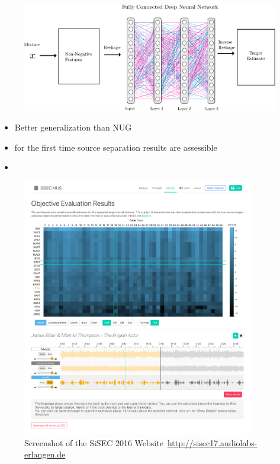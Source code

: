\begin{figure}[ht!]
\centering
		\includegraphics[width=\textwidth]{Chapters/06_Separation_Unknown/figures/uhlich_dnn.pdf}
\caption{}
\label{fig:cft_dnn}
\end{figure}

\begin{itemize}
  \item Better generalization than NUG
\end{itemize}


\begin{itemize}
  \item for the first time source separation results are assessible
  \item
\end{itemize}

\begin{figure}[t]
\centering
\includegraphics[width=0.9\textwidth]{Chapters/06_Separation_Unknown/figures/sisec_website.png}
\caption{Screenshot of the SiSEC 2016 Website~\url{http://sisec17.audiolabs-erlangen.de}}
\label{fig:sisec_website}

\end{figure}

